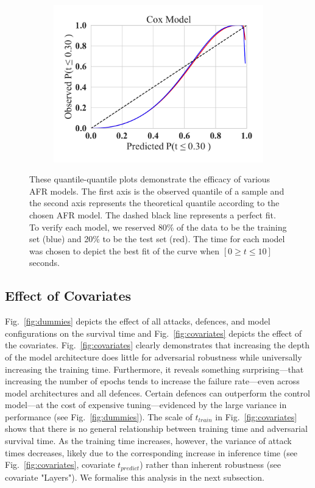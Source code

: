 \begin{figure}
\begin{subfigure}
	\end{subfigure}
	~
	\begin{subfigure}
		\centering
		\includegraphics[width=.30\textwidth]{plots/cox_qq.pdf}
	\end{subfigure}
	\caption{These quantile-quantile plots demonstrate the efficacy of various AFR models. The first axis is the observed quantile of a sample and the second axis represents the theoretical quantile according to the chosen AFR model. The dashed black line represents a perfect fit. To verify each model, we reserved 80\% of the data to be the training set (blue) and 20\% to be the test set (red). The time for each model was chosen to depict the best fit of the curve when $ [ 0 \geq t \leq 10 ] $ seconds. 
 }
	\label{fig:afr_models}
\end{figure}

\subsection{Effect of Covariates}
Fig.~\ref{fig:dummies} depicts the effect of all attacks, defences, and model configurations on the survival time and Fig.~\ref{fig:covariates} depicts the effect of the covariates. 
Fig.~\ref{fig:covariates} clearly demonstrates that increasing the depth of the model architecture does little for adversarial robustness while universally increasing the training time. 
Furthermore, it reveals something surprising---that increasing the number of epochs tends to increase the failure rate---even across model architectures and all defences. 
Certain defences can outperform the control model---at the cost of expensive tuning---evidenced by the large variance in performance (see Fig.~\ref{fig:dummies}). The scale of $t_{train}$  in Fig.~\ref{fig:covariates} shows that there is no general relationship between training time and adversarial survival time. 
As the training time increases, however, the variance of attack times decreases, likely due to the corresponding increase in inference time (see Fig.~\ref{fig:covariates}, covariate $t_{predict}$) rather than inherent robustness (see covariate "Layers").
We formalise this analysis  in the next subsection.

